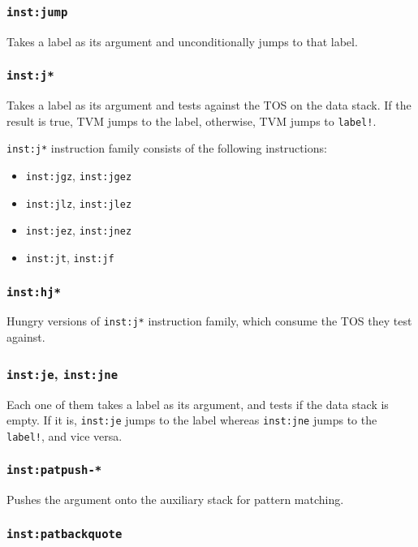 \documentclass{article}
\newcommand{\inst}[1] {\texttt{inst:#1}}
\begin{document}
\subsubsection{\inst{jump}}

Takes a label as its argument and unconditionally jumps to that label.

\subsubsection{\inst{j*}}

Takes a label as its argument and tests against the TOS on the data stack. If the result is true, TVM jumps to the label, otherwise, TVM jumps to \texttt{label!}.

\inst{j*} instruction family consists of the following instructions:
\begin{itemize}
\item \inst{jgz}, \inst{jgez}
\item \inst{jlz}, \inst{jlez}
\item \inst{jez}, \inst{jnez}
\item \inst{jt}, \inst{jf}
\end{itemize}

\subsubsection{\inst{hj*}}

Hungry versions of \inst{j*} instruction family, which consume the TOS they test against.

\subsubsection{\inst{je}, \inst{jne}}

Each one of them takes a label as its argument, and tests if the data stack is empty. If it is, \inst{je} jumps to the label whereas \inst{jne} jumps to the \texttt{label!}, and vice versa.

\subsubsection{\inst{patpush-*}}

Pushes the argument onto the auxiliary stack for pattern matching.

\subsubsection{\inst{patbackquote}}
\end{document}
